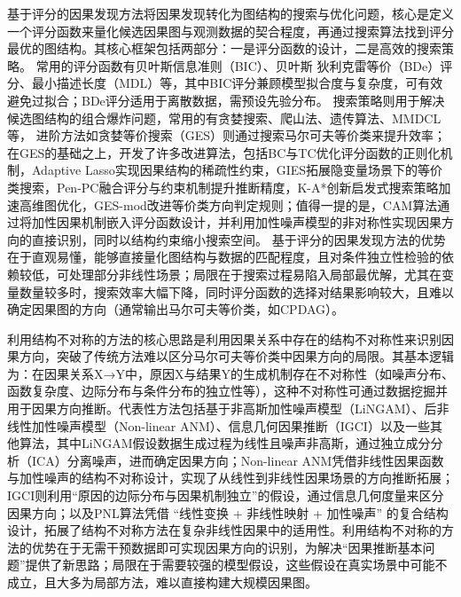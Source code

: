 基于评分的因果发现方法将因果发现转化为图结构的搜索与优化问题，核心是定义一个评分函数来量化候选因果图与观测数据的契合程度，再通过搜索算法找到评分最优的图结构\cite{李硕豪2015}。其核心框架包括两部分：一是评分函数的设计，二是高效的搜索策略。
常用的评分函数有贝叶斯信息准则（BIC）\cite{Geiger1994}、贝叶斯 狄利克雷等价（BDe）评分\cite{Heckerman1995}、最小描述长度（MDL）\cite{Adriaans2008}等，其中BIC评分兼顾模型拟合度与复杂度，可有效避免过拟合；BDe评分适用于离散数据，需预设先验分布。
搜索策略则用于解决候选图结构的组合爆炸问题，常用的有贪婪搜索\cite{Cooper1992}、爬山法\cite{Heckerman1995}、遗传算法\cite{Elidan2008}、MMDCL\cite{郝志峰2025}等，
进阶方法如贪婪等价搜索（GES）\cite{Chickering2003}则通过搜索马尔可夫等价类来提升效率；
在GES的基础之上，开发了许多改进算法，包括BC\cite{ElGhaoui2008}与TC\cite{Pellet2008}优化评分函数的正则化机制，Adaptive Lasso\cite{Michailidis2010}实现因果结构的稀疏性约束，GIES\cite{Hauser2012}拓展隐变量场景下的等价类搜索，Pen-PC\cite{Ha2015}融合评分与约束机制提升推断精度，K-A*\cite{Scanagatta2016}创新启发式搜索策略加速高维图优化，GES-mod\cite{AlonsoBarba2013}改进等价类方向判定规则；值得一提的是，CAM\cite{Buehlmann2013}算法通过将加性因果机制嵌入评分函数设计，并利用加性噪声模型的非对称性实现因果方向的直接识别，同时以结构约束缩小搜索空间。
基于评分的因果发现方法的优势在于直观易懂，能够直接量化图结构与数据的匹配程度，且对条件独立性检验的依赖较低，可处理部分非线性场景；局限在于搜索过程易陷入局部最优解，尤其在变量数量较多时，搜索效率大幅下降，同时评分函数的选择对结果影响较大，且难以确定因果图的方向（通常输出马尔可夫等价类，如CPDAG）\cite{Vowels2022}。

利用结构不对称的方法的核心思路是利用因果关系中存在的结构不对称性来识别因果方向，突破了传统方法难以区分马尔可夫等价类中因果方向的局限。其基本逻辑为：在因果关系X→Y中，原因X与结果Y的生成机制存在不对称性（如噪声分布、函数复杂度、边际分布与条件分布的独立性等），这种不对称性可通过数据挖掘并用于因果方向推断。代表性方法包括基于非高斯加性噪声模型（LiNGAM）\cite{Shimizu2006}、后非线性加性噪声模型（Non-linear ANM）\cite{Patrik2008}、信息几何因果推断（IGCI）\cite{Janzing2012}以及一些其他算法\cite{潘夷琛}，其中LiNGAM假设数据生成过程为线性且噪声非高斯，通过独立成分分析（ICA）分离噪声，进而确定因果方向；Non-linear ANM凭借非线性因果函数与加性噪声的结构不对称设计，实现了从线性到非线性因果场景的方向推断拓展；IGCI则利用“原因的边际分布与因果机制独立”的假设，通过信息几何度量来区分因果方向；以及PNL算法\cite{Zhang2009}凭借 “线性变换 + 非线性映射 + 加性噪声” 的复合结构设计，拓展了结构不对称方法在复杂非线性因果中的适用性。利用结构不对称的方法的优势在于无需干预数据即可实现因果方向的识别，为解决“因果推断基本问题”提供了新思路；局限在于需要较强的模型假设，这些假设在真实场景中可能不成立，且大多为局部方法，难以直接构建大规模因果图。

